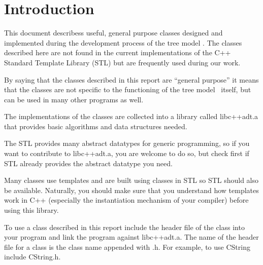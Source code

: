 \section{Introduction}

This document describess useful, general purpose  classes 
designed and implemented during the development  
process of the tree model \lignum. The classes described here are not found in 
the current implementations of the C++ Standard Template Library (STL) 
but are frequently used during our work. 

By saying that the classes described in this report are
``general purpose'' it means that the classes are not
specific to the functioning of the tree model \lignum\
itself, but can be used in many other programs as well.

The implementations of the classes are collected into a 
library called \linebreak libc++adt.a that provides basic algorithms 
and data structures needed.

The STL provides many abstract datatypes for generic programming, so
if you want to contribute to libc++adt.a, you are welcome
to do so, but check first if STL already provides the abstract
datatype you need. 

Many classes use templates and are built using classes in STL
so STL should also be available. Naturally, you should make sure 
that you understand how templates work in C++ (especially the instantiation
mechanism of your compiler) before using this library. 

To use a class described in this report
include the header file of the class into your program
and link the program against libc++adt.a. The name of the 
header file for a class is the class name appended with .h. 
For example, to use CString include CString.h.
